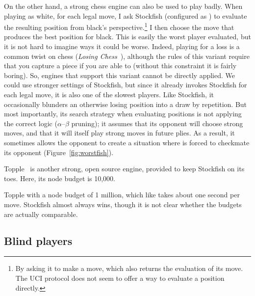 \documentclass[10pt,preprint,twocolumn]{acmart}
\begin{document}
 On the other hand, a strong chess engine
can also be used to play badly. When playing as white, for each legal
move, I ask Stockfish (configured as ) to evaluate
the resulting position from black's perspective.\footnote{By asking it
  to make a move, which also returns the evaluation of its move. The
  UCI protocol does not seem to offer a way to evaluate a position
  directly.} I then choose the move that produces the best position
for black. This is easily the worst player evaluated, but it is not
hard to imagine ways it could be worse. Indeed, playing for a loss is
a common twist on chess ({\it Losing
  Chess}~\cite{wikipedialosingchess}), although the rules of this
variant require that you capture a piece if you are able to (without
this constraint it is fairly boring). So, engines that support this
variant cannot be directly applied. We could use stronger settings of
Stockfish, but since it already invokes Stockfish for each legal move,
it is also one of the slowest players. Like Stockfish, it occasionally
blunders an otherwise losing position into a draw by repetition. But
most importantly, its search strategy when evaluating positions is not
applying the correct logic ($\alpha$--$\beta$ pruning); it assumes that
its opponent will choose strong moves, and that it will itself play
strong moves in future plies. As a result, it sometimes allows the
opponent to create a situation where  is forced to
checkmate its opponent (Figure~\ref{fig:worstfish}).

 Topple~\cite{topple} is another strong,
open source engine, provided to keep Stockfish on its toes. Here,
its node budget is 10,000. \traditional

 Topple with a node budget of 1 million,
which like  takes about one second per move.
Stockfish almost always wins, though it is not clear whether the
budgets are actually comparable. \traditional

 \deterministic \traditional

 \deterministic \traditional

\subsection{Blind players}


\end{document}
